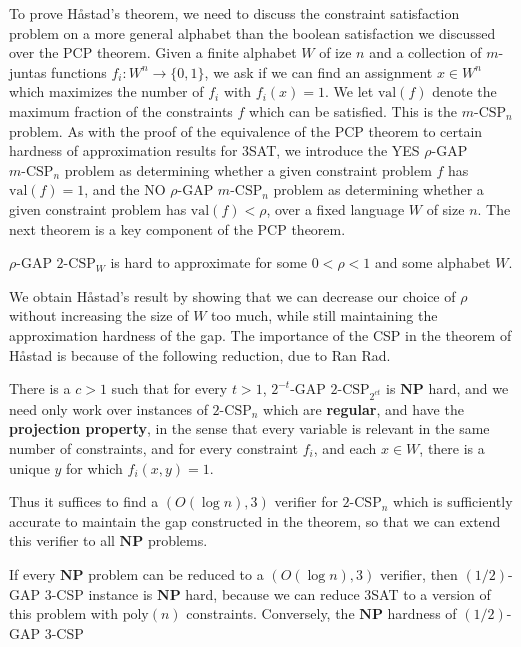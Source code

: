 To prove Håstad's theorem, we need to discuss the constraint satisfaction problem on a more general alphabet than the boolean satisfaction we discussed over the PCP theorem. Given a finite alphabet $W$ of ize $n$ and a collection of $m$-juntas functions $f_i: W^n \to \{ 0, 1 \}$, we ask if we can find an assignment $x \in W^n$ which maximizes the number of $f_i$ with $f_i(x) = 1$.  We let $\text{val}(f)$ denote the maximum fraction of the constraints $f$ which can be satisfied. This is the $m\text{-CSP}_n$ problem. As with the proof of the equivalence of the PCP theorem to certain hardness of approximation results for 3SAT, we introduce the YES $\rho$-GAP $m\text{-CSP}_n$ problem as determining whether a given constraint problem $f$ has $\text{val}(f) = 1$, and the NO $\rho$-GAP $m\text{-CSP}_n$ problem as determining whether a given constraint problem has $\text{val}(f) < \rho$, over a fixed language $W$ of size $n$. The next theorem is a key component of the PCP theorem.

\begin{theorem}
    $\rho$-GAP $2\text{-CSP}_W$ is hard to approximate for some $0 < \rho < 1$ and some alphabet $W$.
\end{theorem}

We obtain Håstad's result by showing that we can decrease our choice of $\rho$ without increasing the size of $W$ too much, while still maintaining the approximation hardness of the gap. The importance of the CSP in the theorem of Håstad is because of the following reduction, due to Ran Rad.

\begin{theorem}
    There is a $c > 1$ such that for every $t > 1$, $2^{-t}$-GAP $2\text{-CSP}_{2^{ct}}$ is $\mathbf{NP}$ hard, and we need only work over instances of $2\text{-CSP}_n$ which are {\bf regular}, and have the {\bf projection property}, in the sense that every variable is relevant in the same number of constraints, and for every constraint $f_i$, and each $x \in W$, there is a unique $y$ for which $f_i(x,y) = 1$.
\end{theorem}

Thus it suffices to find a $(O(\log n), 3)$ verifier for $2\text{-CSP}_n$ which is sufficiently accurate to maintain the gap constructed in the theorem, so that we can extend this verifier to all $\mathbf{NP}$ problems.

If every $\mathbf{NP}$ problem can be reduced to a $(O(\log n), 3)$ verifier, then $(1/2)$-GAP 3-CSP instance is $\mathbf{NP}$ hard, because we can reduce 3SAT to a version of this problem with $\text{poly}(n)$ constraints. Conversely, the $\mathbf{NP}$ hardness of $(1/2)$-GAP 3-CSP

